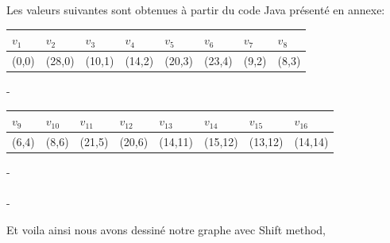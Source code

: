 \documentclass[hidelinks,letterpaper,12pt]{article}
\begin{document}
\begin{figure}[H]
\label{Diagramme}	
\end{figure}

Les valeurs suivantes sont obtenues à partir du code Java présenté en annexe: \\
\begin{tabularx}{\textwidth}{|*{8}{X|}}
\hline
$v_1$ & $v_2$  & $v_3$ & $v_4$  & $v_5$  & $v_6$  & $v_7$ & $v_8$ \\
\hline 
(0,0) & (28,0) & (10,1) & (14,2) & (20,3) & (23,4) & (9,2) & (8,3) \\
\hline
\end{tabularx}
{\color{white}-}
\\
\begin{tabularx}{\textwidth}{|*{8}{X|}}
\hline
$v_9$ & $v_{10}$ & $v_{11}$ & $v_{12}$ & $v_{13}$ & $v_{14}$ & $v_{15}$ & $v_{16}$ \\
\hline 
(6,4) & (8,6)    & (21,5)   & (20,6)   & (14,11)  & (15,12)   & (13,12) & (14,14) \\
\hline
\end{tabularx}
{\color{white}-}
\\ \\
{\color{white}-}

Et voila ainsi nous avons dessiné notre graphe avec Shift method, 


\newpage
\end{document}
